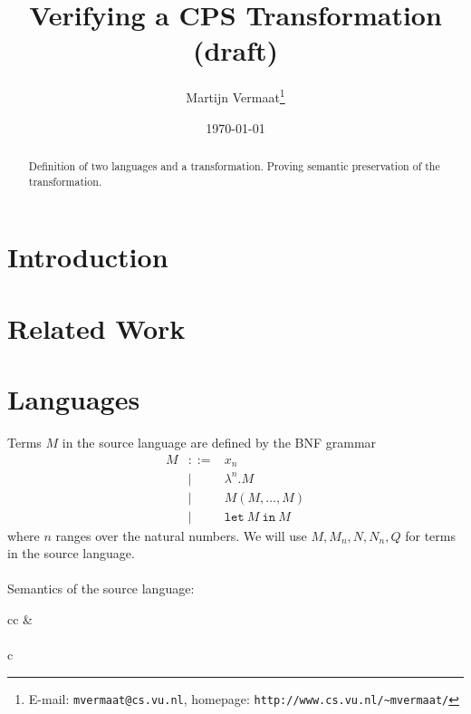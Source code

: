 \documentclass[a4paper,11pt]{article}
\title{Verifying a CPS Transformation (draft)}
\author{Martijn Vermaat\footnote{E-mail: \texttt{mvermaat@cs.vu.nl},
    homepage: \texttt{http://www.cs.vu.nl/\~{}mvermaat/}}}
\date{\today}
\begin{document}
\maketitle


\begin{abstract}
  Definition of two languages and a transformation. Proving semantic preservation of the transformation.
\end{abstract}


\section{Introduction}\label{sec:introduction}


\section{Related Work}\label{sec:related}


\section{Languages}\label{sec:languages}

Terms $M$ in the source language are defined by the BNF grammar
\begin{eqnarray*}
M & ::= & x_{n} \\
  &   | & \lambda^{n}.M \\
  &   | & M(M, \ldots, M) \\
  &   | & \texttt{let} \: M \: \texttt{in} \: M
\end{eqnarray*}
where $n$ ranges over the natural numbers.
We will use $M, M_{n}, N, N_{n}, Q$ for terms in the source language.

\paragraph{}

Semantics of the source language:

\begin{center}

\begin{tabular}{cc}
 &
 \\
\end{tabular}

\paragraph{}

\begin{tabular}{c}
\end{tabular}

\end{center}
\end{document}
